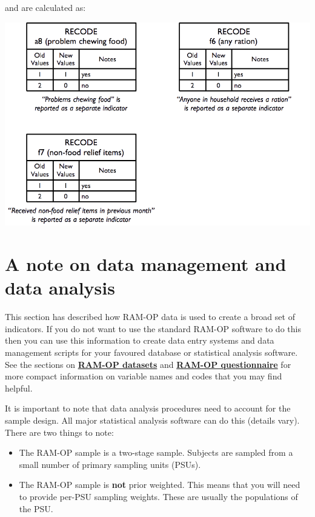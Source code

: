 \documentclass[12pt,a4paper]{book}
\providecommand{\tightlist}{%
  \setlength{\itemsep}{0pt}\setlength{\parskip}{0pt}}
\theoremstyle{definition}
\theoremstyle{definition}
\theoremstyle{definition}
\theoremstyle{remark}
\begin{document}
and are calculated as:

\begin{center}\includegraphics[width=800pt]{figures/indicators30} \end{center}

\hypertarget{a-note-on-data-management-and-data-analysis}{%
\section{A note on data management and data
analysis}\label{a-note-on-data-management-and-data-analysis}}

This section has described how RAM-OP data is used to create a broad set
of indicators. If you do not want to use the standard RAM-OP software to
do this then you can use this information to create data entry systems
and data management scripts for your favoured database or statistical
analysis software. See the sections on
\protect\hyperlink{datasets}{\textbf{RAM-OP datasets}} and
\protect\hyperlink{questionnaire}{\textbf{RAM-OP questionnaire}} for
more compact information on variable names and codes that you may find
helpful.

It is important to note that data analysis procedures need to account
for the sample design. All major statistical analysis software can do
this (details vary). There are two things to note:

\begin{itemize}
\tightlist
\item
  The RAM-OP sample is a two-stage sample. Subjects are sampled from a
  small number of primary sampling units (PSUs).
\item
  The RAM-OP sample is \textbf{not} prior weighted. This means that you
  will need to provide per-PSU sampling weights. These are usually the
  populations of the PSU.
\end{itemize}
\end{document}

